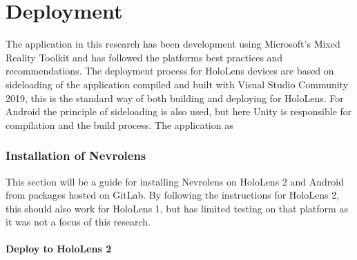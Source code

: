 \chapter{Deployment}

The application in this research has been development using Microsoft's Mixed Reality Toolkit and has followed the platforms best practices and recommendations. The deployment process for HoloLens devices are based on sideloading of the application compiled and built with Visual Studio Community 2019, this is the standard way of both building and deploying for HoloLens. For Android the principle of sideloading is also used, but here Unity is responsible for compilation and the build process. 
The application as 


\subsection*{Installation of Nevrolens}

This section will be a guide for installing Nevrolens on HoloLens 2 and Android from packages hosted on GitLab.
By following the instructions for HoloLens 2, this should also work for HoloLens 1, but has limited testing on that platform as it was not a focus of this research.

\subsubsection*{Deploy to HoloLens 2}

